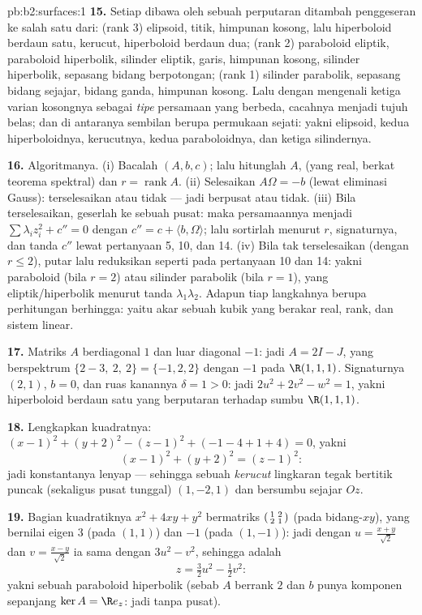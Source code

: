 \begin{solution}{pb:b2:surfaces:1}
\textbf{15.} Setiap  dibawa oleh sebuah perputaran ditambah
penggeseran ke salah satu dari: (rank 3) elipsoid, titik, himpunan
kosong, lalu hiperboloid berdaun satu, kerucut, hiperboloid berdaun dua;
(rank 2) paraboloid eliptik, paraboloid hiperbolik, silinder
eliptik, garis, himpunan kosong, silinder hiperbolik, sepasang bidang
berpotongan; (rank 1) silinder parabolik, sepasang bidang
sejajar, bidang ganda, himpunan kosong. Lalu dengan mengenali
ketiga varian kosongnya sebagai \emph{tipe } persamaan yang berbeda,
cacahnya menjadi tujuh belas; dan di antaranya sembilan berupa
permukaan sejati: yakni elipsoid, kedua hiperboloidnya, kerucutnya, kedua
paraboloidnya, dan ketiga silindernya.

\textbf{16.} Algoritmanya. (i) Bacalah $(A, b, c)$; lalu hitunglah
 $A$,  (yang real, berkat
teorema spektral) dan $r = \operatorname{rank}A$. (ii)
Selesaikan $A\Omega = -b$ (lewat eliminasi Gauss): terselesaikan atau tidak
--- jadi berpusat atau tidak. (iii) Bila terselesaikan, geserlah ke sebuah pusat:
maka persamaannya menjadi $\sum\lambda_iz_i^2 + c'' = 0$ dengan $c''
= c + \langle b, \Omega\rangle$; lalu sortirlah menurut $r$, signaturnya,
dan tanda $c''$ lewat pertanyaan 5, 10, dan 14. (iv) Bila tak
terselesaikan (dengan $r \leq 2$), putar lalu reduksikan seperti pada pertanyaan 10
dan 14: yakni paraboloid (bila $r = 2$) atau silinder parabolik (bila $r = 1$),
yang eliptik/hiperbolik menurut tanda
$\lambda_1\lambda_2$. Adapun tiap langkahnya berupa perhitungan berhingga:
yaitu akar sebuah kubik yang berakar real, rank, dan sistem linear.

\textbf{17.} Matriks $A$ berdiagonal $1$ dan luar diagonal $-1$: jadi $A = 2I
- J$, yang berspektrum $\{2 - 3,\ 2,\ 2\} = \{-1, 2, 2\}$ dengan $-1$
pada $\R(1,1,1)$. Signaturnya $(2,1)$, $b = 0$, dan ruas kanannya
$\delta = 1 > 0$: jadi $2u^2 + 2v^2 - w^2 = 1$, yakni hiperboloid berdaun
satu yang berputaran terhadap sumbu $\R(1,1,1)$.

\textbf{18.} Lengkapkan kuadratnya: $(x-1)^2 + (y+2)^2 - (z-1)^2 +
(-1 - 4 + 1 + 4) = 0$, yakni
\[
(x-1)^2 + (y+2)^2 = (z-1)^2 :
\]
jadi konstantanya lenyap --- sehingga sebuah \emph{kerucut} lingkaran tegak
bertitik puncak (sekaligus pusat tunggal) $(1, -2, 1)$ dan bersumbu sejajar
$Oz$.

\textbf{19.} Bagian kuadratiknya $x^2 + 4xy + y^2$ bermatriks
$\begin{psmallmatrix}1 & 2\\ 2 & 1\end{psmallmatrix}$ (pada
bidang-$xy$), yang bernilai eigen $3$ (pada $(1,1)$) dan $-1$ (pada
$(1,-1)$): jadi dengan $u = \frac{x+y}{\sqrt2}$ dan $v =
\frac{x-y}{\sqrt2}$ ia sama dengan $3u^2 - v^2$, sehingga 
adalah
\[
z = \tfrac32u^2 - \tfrac12v^2 :
\]
yakni sebuah paraboloid hiperbolik (sebab $A$ berrank $2$ dan $b$ punya
komponen sepanjang $\ker A = \R e_z$: jadi tanpa pusat).


\end{solution}
